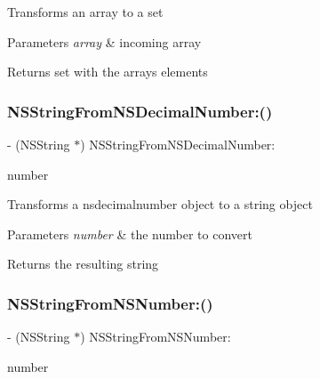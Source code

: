 Transforms an array to a set 
\begin{DoxyParams}{Parameters}
{\em array} & incoming array \\
\hline
\end{DoxyParams}
\begin{DoxyReturn}{Returns}
set with the array\textquotesingle{}s elements 
\end{DoxyReturn}
\mbox{\label{interface_o_p_t_l_y_j_s_o_n_value_transformer_ad3e6a8cc2d919b417fd547afcb9cb0f2}} 
\subsubsection{\texorpdfstring{N\+S\+String\+From\+N\+S\+Decimal\+Number\+:()}{NSStringFromNSDecimalNumber:()}}
{\footnotesize\ttfamily -\/ (N\+S\+String $\ast$) N\+S\+String\+From\+N\+S\+Decimal\+Number\+: \begin{DoxyParamCaption}\item[{(N\+S\+Decimal\+Number $\ast$)}]{number }\end{DoxyParamCaption}}

Transforms a nsdecimalnumber object to a string object 
\begin{DoxyParams}{Parameters}
{\em number} & the number to convert \\
\hline
\end{DoxyParams}
\begin{DoxyReturn}{Returns}
the resulting string 
\end{DoxyReturn}
\mbox{\label{interface_o_p_t_l_y_j_s_o_n_value_transformer_a4044652aaf83fbbe927b0b21e895ce20}} 
\subsubsection{\texorpdfstring{N\+S\+String\+From\+N\+S\+Number\+:()}{NSStringFromNSNumber:()}}
{\footnotesize\ttfamily -\/ (N\+S\+String $\ast$) N\+S\+String\+From\+N\+S\+Number\+: \begin{DoxyParamCaption}\item[{(N\+S\+Number $\ast$)}]{number }\end{DoxyParamCaption}}


